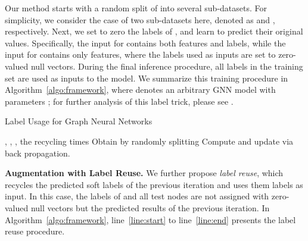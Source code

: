 \documentclass[sigconf,screen,nonacm]{acmart} \usepackage{booktabs}
\newcommand{\minisection}[1]{\vspace{5pt}\noindent\textbf{#1.}}
\begin{document}
	Our method starts with a random split of  into several sub-datasets.
	For simplicity, we consider the case of two sub-datasets here, denoted as  and , respectively.
	Next, we set to zero the labels of , and learn to predict their original values.
	Specifically, the input for  contains both features and labels, while the input for  contains only features, where the labels used as inputs are set to zero-valued null vectors.
	During the final inference procedure, all labels in the training set are used as inputs to the model.
	We summarize this training procedure in Algorithm~\ref{algo:framework}, where  denotes an arbitrary GNN model with parameters ; for further analysis of this label trick, please see \cite{wang2021why}.
	
	\begin{algorithm}[t]
		\caption{Label Usage for Graph Neural Networks}
		\label{algo:framework}
		\begin{algorithmic}[1]
			\REQUIRE , , , the recycling times 
\STATE Obtain  by randomly splitting 
			\STATE 
			\label{line:linelabel}
			\STATE 
{}
			\label{line:start}
			\STATE 
			\STATE 
			\ENDFOR
			\label{line:end}
			\STATE Compute  and update  via back propagation.
			\ENDFOR
		\end{algorithmic}
	\end{algorithm}


	\minisection{Augmentation with Label Reuse}
	We further propose \textit{label reuse}, which recycles the predicted soft labels of the previous iteration and uses them labels as input.
	In this case, the labels of  and all test nodes are not assigned with zero-valued null vectors but the predicted results of the previous iteration.
In Algorithm~\ref{algo:framework}, line~\ref{line:start} to line~\ref{line:end} presents the label reuse procedure.
\end{document}
